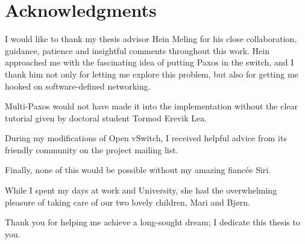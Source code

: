 \cleardoublepage%
\chapter*{Acknowledgments}%
\thispagestyle{empty}%

I would like to thank my thesis advisor Hein Meling for his close
collaboration, guidance, patience and insightful comments throughout this
work.
%
Hein approached me with the fascinating idea of putting Paxos in the
switch, and I thank him not only for letting me explore this problem, but
also for getting me hooked on software-defined networking.

Multi-Paxos would not have made it into the implementation without the
clear tutorial given by doctoral student Tormod Erevik Lea.

During my modifications of Open vSwitch, I received helpful advice from
its friendly community on the project mailing list.

Finally, none of this would be possible without my amazing fiancée Siri.

While I spent my days at work and University, she had the overwhelming
pleasure of taking care of our two lovely children, Mari and Bjørn.

Thank you for helping me achieve a long-sought dream; I dedicate this
thesis to you.
